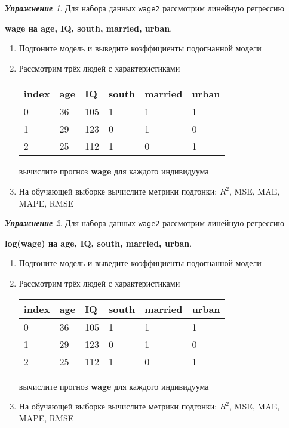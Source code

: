 \documentclass[a4,12pt]{article}
\theoremstyle{remark}
\newtheorem{exercise}{\textbf{Упражнение}}[section]
\begin{document}
\begin{exercise}
Для набора данных \texttt{wage2} рассмотрим линейную регрессию 
\begin{center}
	\textbf{wage на age, IQ, south, married, urban}.
\end{center}
\begin{enumerate}
	\item Подгоните модель и выведите коэффициенты подогнанной модели
	\item Рассмотрим трёх людей с характеристиками
	\begin{center}
		\begin{tabular}{|l||l|l|l|l|l|}\hline
			index & age & IQ & south & married & urban \\ \hline\hline
			0 & 36 & 105 & 1 & 1 & 1 \\
			1 & 29 & 123 & 0 & 1 & 0 \\
			2 & 25 & 112 & 1 & 0 & 1 \\ \hline
		\end{tabular}
	\end{center}
	вычислите прогноз \textbf{wage} для каждого индивидуума
	\item На обучающей выборке вычислите метрики подгонки: \(R^2\), 
	MSE, MAE, MAPE, RMSE
\end{enumerate}
\end{exercise}

\begin{exercise}
Для набора данных \texttt{wage2} рассмотрим линейную регрессию 
\begin{center}
	\textbf{log(wage) на age, IQ, south, married, urban}.
\end{center}
\begin{enumerate}
	\item Подгоните модель и выведите коэффициенты подогнанной модели
	\item Рассмотрим трёх людей с характеристиками
	\begin{center}
		\begin{tabular}{|l||l|l|l|l|l|}\hline
			index & age & IQ & south & married & urban \\ \hline\hline
			0 & 36 & 105 & 1 & 1 & 1 \\
			1 & 29 & 123 & 0 & 1 & 0 \\
			2 & 25 & 112 & 1 & 0 & 1 \\ \hline
		\end{tabular}
	\end{center}
	вычислите прогноз \textbf{wage} для каждого индивидуума
	\item На обучающей выборке вычислите метрики подгонки: \(R^2\), 
	MSE, MAE, MAPE, RMSE
\end{enumerate}
\end{exercise}
\end{document}
